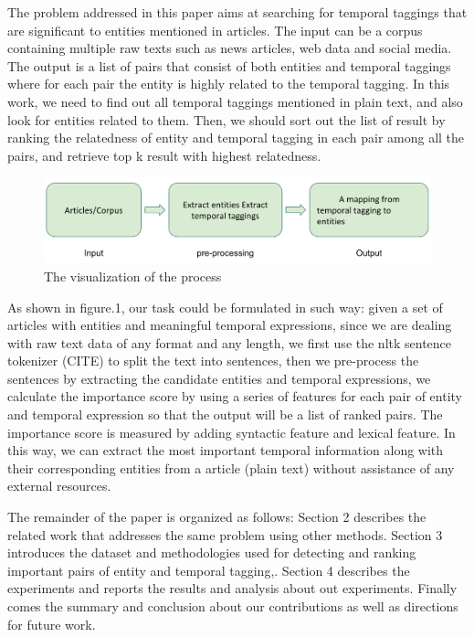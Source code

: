 \documentclass[12pt,a4paper]{article}
\begin{document}
The problem addressed in this paper aims at searching for temporal taggings that are significant to entities mentioned in articles. The input can be a corpus containing multiple raw texts such as news articles, web data and social media. The output is a list of pairs that consist of both entities and temporal taggings where for each pair the entity is highly related to the temporal tagging. In this work, we need to find out all temporal taggings mentioned in plain text, and also look for entities related to them. Then, we should sort out the list of result by ranking the relatedness of entity and temporal tagging in each pair among all the pairs, and retrieve top k result with highest relatedness.

\begin{figure}
    \includegraphics[width=\linewidth]{demo}
    \caption{The visualization of the process}
\end{figure}

As shown in figure.1, our task could be formulated in such way: given a set of articles with entities and meaningful temporal expressions, since we are dealing with raw text data of any format and any length, we first use the nltk sentence tokenizer (CITE) to split the text into sentences, then we pre-process the sentences by extracting the candidate entities and temporal expressions, we calculate the importance score by using a series of features for each pair of entity and temporal expression so that the output will be a list of ranked pairs. The importance score is measured by adding syntactic feature and lexical feature. In this way, we can extract the most important temporal information along with their corresponding entities from a article (plain text) without assistance of any external resources.

The remainder of the paper is organized as follows: Section 2 describes the related work that addresses the same problem using other methods. Section 3 introduces the dataset and methodologies used for detecting and ranking important pairs of entity and temporal tagging,. Section 4 describes the experiments and reports the results and analysis about out experiments. Finally comes the summary and conclusion about our contributions as well as directions for future work.
\end{document}
